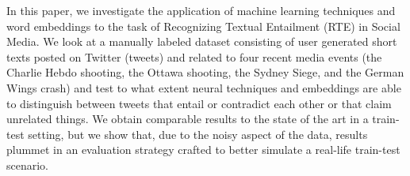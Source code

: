 In this paper, we investigate the application of machine learning techniques and word embeddings to the task of Recognizing Textual Entailment (RTE) in Social Media. We look at a manually labeled dataset consisting of user generated short texts posted on Twitter (tweets) and related to four recent media events (the Charlie Hebdo shooting, the Ottawa shooting, the Sydney Siege, and the German Wings crash) and test to what extent neural techniques and embeddings are able to distinguish between tweets that entail or contradict each other or that claim unrelated things. We obtain comparable results to the state of the art in a train-test setting, but we show that, due to the noisy aspect of the data, results plummet in an evaluation strategy crafted to better simulate a real-life train-test scenario.
